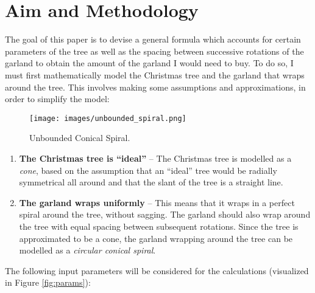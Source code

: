\section*{Aim and Methodology}
The goal of this paper is to devise a general formula which accounts for certain parameters of the tree as well as the spacing between successive rotations of the garland to obtain the amount of the garland I would need to buy. To do so, I must first mathematically model the Christmas tree and the garland that wraps around the tree. This involves making some assumptions and approximations, in order to simplify the model:
\begin{wrapfigure}{r}{0.35\textwidth}
    \texttt{[image: images/unbounded\_spiral.png]}
    \caption{Unbounded Conical Spiral.}
    \vspace*{-15pt}
\end{wrapfigure}
\begin{enumerate}[leftmargin=!, itemindent=-5ex]
    \item \textbf{The Christmas tree is “ideal”} -- The Christmas tree is modelled as a \emph{cone}, based on the assumption that an “ideal” tree would be radially symmetrical all around and that the slant of the tree is a straight line.
    \item \textbf{The garland wraps uniformly} -- This means that it wraps in a perfect spiral around the tree, without sagging. The garland should also wrap around the tree with equal spacing between subsequent rotations. Since the tree is approximated to be a cone, the garland wrapping around the tree can be modelled as a \emph{circular conical spiral}.
\end{enumerate}
The following input parameters will be considered for the calculations (visualized in Figure \ref{fig:params}):

